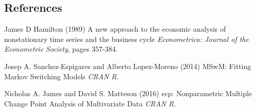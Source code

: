 \documentclass{beamer}
\begin{document}
\subsection{References}
\begin{frame}
\footnotesize{
	\begin{thebibliography}{99} %
		 James D Hamilton (1989)
		\newblock A new approach to the economic analysis of nonstationary time series and the business cycle
		\newblock \emph{Econometrica: Journal of the Econometric Society}, pages 357-384.
	\end{thebibliography}
	
	\begin{thebibliography}{99} %
		 Josep A. Sanchez-Espigares and Alberto Lopez-Moreno (2014)
		\newblock MSwM: Fitting Markov Switching Models
		\newblock \emph{CRAN R}.
	\end{thebibliography}

	\begin{thebibliography}{99} %
		 Nicholas A. James and David S. Matteson (2016)
		\newblock ecp: Nonparametric Multiple Change Point Analysis of Multivariate Data
		\newblock \emph{CRAN R}.
	\end{thebibliography}
}
\end{frame}
\end{document}

